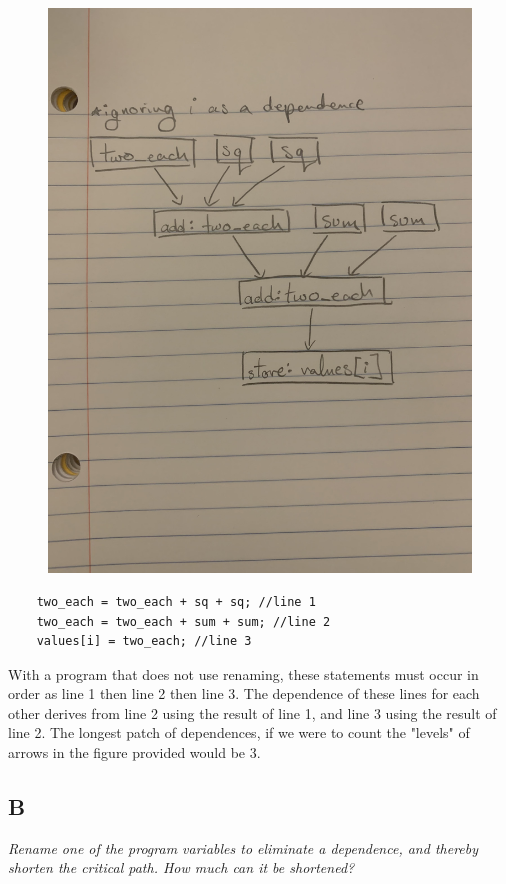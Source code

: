 \documentclass[10pt]{article}
\begin{document}
\begin{figure}
    \includegraphics[width=\linewidth]{CS Pic.jpg}
\end{figure}

\begin{lstlisting}
    two_each = two_each + sq + sq; //line 1
    two_each = two_each + sum + sum; //line 2
    values[i] = two_each; //line 3
\end{lstlisting}

With a program that does not use renaming, these statements must occur in order as line 1 then line 2 then line 3. The dependence of these lines for 
each other derives from line 2 using the result of line 1, and line 3 using the result of line 2. The longest patch of dependences, if we were to count 
the "levels" of arrows in the figure provided would be 3. 

\subsection{B}
\textit{Rename one of the program variables to eliminate a dependence, and thereby shorten
the critical path. How much can it be shortened?}
\end{document}
